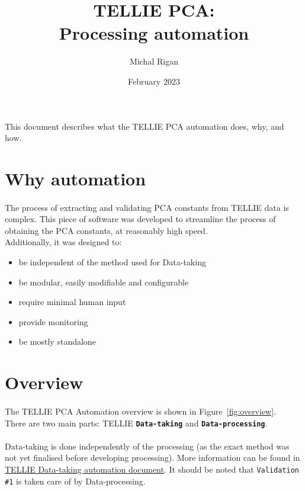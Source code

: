 \documentclass[12pt]{article}
\title{\textbf{TELLIE PCA: \\ Processing automation}}
\date{February 2023}
\author{Michal Rigan}
\begin{document}
\maketitle{}

\vspace{7cm}
\paragraph{}
This document describes what the TELLIE PCA automation does, why, and how.
\clearpage

\tableofcontents

\clearpage

\section{Why automation}
\paragraph{}
The process of extracting and validating PCA constants from TELLIE data is complex. This piece of software was developed to streamline the process of obtaining the PCA constants, at reasonably high speed. \\
Additionally, it was designed to:
\begin{itemize}
	\item be independent of the method used for Data-taking
	\item be modular, easily modifiable and configurable
	\item require minimal human input
	\item provide monitoring
	\item be mostly standalone
\end{itemize}

\section{Overview}
\paragraph{}
The TELLIE PCA Automation overview is shown in Figure~\ref{fig:overview}.\\There are two main parts: TELLIE \textbf{\texttt{Data-taking}} and \textbf{\texttt{Data-processing}}.

\paragraph{}
Data-taking is done independently of the processing (as the exact method was not yet finalised before developing processing). More information can be found in \href{https://www.snolab.ca/snoplus/private/DocDB/cgi/ShowDocument?docid=7612}{TELLIE Data-taking automation document}. It should be noted that \texttt{Validation \#1} is taken care of by Data-processing.
\end{document}
